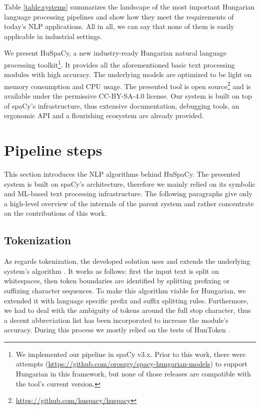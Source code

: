 \documentclass{llncs}
\newcommand{\huspacy}{HuSpaCy}
\newcommand{\huntoken}{HunToken}
\begin{document}
Table \ref{table:systems} summarizes the landscape of the most important Hungarian language processing pipelines and show how they meet the requirements of today’s NLP applications. All in all, we can say that none of them is easily applicable in industrial settings.

We present \huspacy{}, a new industry-ready Hungarian natural language processing toolkit\footnote{We implemented our pipeline in spaCy v3.x. Prior to this work, there were attempts (\url{https://github.com/oroszgy/spacy-hungarian-models}) to support Hungarian in this framework, but none of those releases are compatible with the tool’s current version.}. 
It provides all the aforementioned basic text processing modules with high accuracy. The underlying models are optimized to be light on memory consumption and CPU usage. The presented tool is open source\footnote{\url{https://github.com/huspacy/huspacy}} and is available under the permissive CC-BY-SA-4.0 license. Our system is built on top of spaCy’s infrastructure, thus extensive documentation, debugging tools, an ergonomic API and a flourishing ecosystem are already provided.

\section{Pipeline steps}

This section introduces the NLP algorithms behind \huspacy{}. The presented system is built on spaCy’s architecture, therefore we mainly relied on its symbolic and ML-based text processing infrastructure. The following paragraphs give only a high-level overview of the internals of the parent system and rather concentrate on the contributions of this work.

\subsection{Tokenization}

As regards tokenization, the developed solution uses and extends the underlying system’s algorithm \citep{spacy-tokenization}. It works as follows: first the input text is split on whitespaces, then token boundaries are identified by splitting prefixing or suffixing character sequences. To make this algorithm viable for Hungarian, we extended it with language specific prefix and suffix splitting rules. Furthermore, we had to deal with the ambiguity of tokens around the full stop character, thus a decent abbreviation list has been incorporated to increase the module’s accuracy. During this process we mostly relied on the tests of \huntoken{} \citep{huntoken}.
\end{document}

